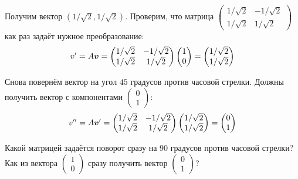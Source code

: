\documentclass[a4paper,12pt]{article}
\begin{document}
  Получим вектор $\left(1/\sqrt{2}, 1/\sqrt{2}\right)$.
  Проверим, что матрица $\left(\begin{smallmatrix}1/\sqrt{2} & -1/\sqrt{2}\\ 1/\sqrt{2} & 1/\sqrt{2}\end{smallmatrix}\right)$ как раз задаёт нужное преобразование:
  \[
    v'
    = A \boldsymbol v
    = \begin{pmatrix}
        1/\sqrt{2} & -1/\sqrt{2}\\
        1/\sqrt{2} & 1/\sqrt{2}
      \end{pmatrix}
      \begin{pmatrix}
        1 \\ 0
      \end{pmatrix}
    = \begin{pmatrix}
        1/\sqrt{2} \\ 1/\sqrt{2}
      \end{pmatrix}
  \]
  
  Снова повернём вектор на угол $45$ градусов против часовой стрелки.
  Должны получить вектор с компонентами $\left(\begin{smallmatrix}0 \\ 1\end{smallmatrix}\right)$:
  \[
    v''
    = A \boldsymbol v'
    = \begin{pmatrix}
        1/\sqrt{2} & -1/\sqrt{2}\\
        1/\sqrt{2} & 1/\sqrt{2}
      \end{pmatrix}
      \begin{pmatrix}
        1/\sqrt{2} \\ 1/\sqrt{2}
      \end{pmatrix}
    = \begin{pmatrix}
        0 \\ 1
      \end{pmatrix}
  \]
  
  Какой матрицей задаётся поворот сразу на $90$ градусов против часовой стрелки?
  Как из вектора
  $\left(\begin{smallmatrix}1 \\ 0\end{smallmatrix}\right)$
  сразу получить вектор
  $\left(\begin{smallmatrix}0 \\ 1\end{smallmatrix}\right)$?
  
\end{document}
